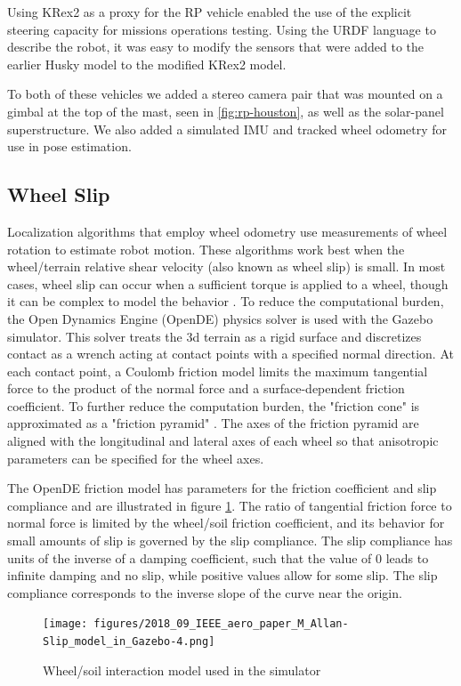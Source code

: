 \documentclass[twocolumn,letterpaper]{IEEEAerospaceCLS}  %
\begin{document}
Using KRex2 as a proxy for the RP vehicle enabled the use of the explicit steering capacity for missions operations testing.  
Using the URDF language to describe the robot, it was easy to modify the sensors that were added to the earlier Husky model to the modified KRex2 model.  


To both of these vehicles we added a stereo camera pair that was mounted on a gimbal at the top of the mast, seen in \cref{fig:rp-houston}, as well as the solar-panel superstructure. 
We also added a simulated IMU and tracked wheel odometry for use in pose estimation.  

\subsection{Wheel Slip}
Localization algorithms that employ wheel odometry use measurements of wheel rotation to estimate robot motion.
These algorithms work best when the wheel/terrain relative shear velocity (also known as wheel slip) is small.
In most cases, wheel slip can occur when a sufficient torque is applied to a wheel,
though it can be complex to model the behavior \cite{yoshida1013712}.
To reduce the computational burden, the Open Dynamics Engine (OpenDE) physics solver is used with the Gazebo simulator.
This solver treats the 3d terrain as a rigid surface and discretizes contact as a wrench
acting at contact points with a specified normal direction.
At each contact point, a Coulomb friction model limits the maximum tangential force
to the product of the normal force and a surface-dependent friction coefficient.
To further reduce the computation burden, the "friction cone" is approximated
as a "friction pyramid" \cite{hsuPeters2014}.
The axes of the friction pyramid are aligned with the longitudinal and lateral axes of each wheel
so that anisotropic parameters can be specified for the wheel axes.

The OpenDE friction model has parameters for the friction coefficient and slip compliance
and are illustrated in figure \ref{fig:wheelsoilmodel}.
The ratio of tangential friction force to normal force is limited by the wheel/soil friction coefficient,
and its behavior for small amounts of slip is governed by the slip compliance.
The slip compliance has units of the inverse of a damping coefficient,
such that the value of 0 leads to infinite damping and no slip,
while positive values allow for some slip.
The slip compliance corresponds to the inverse slope of the curve near the origin.

\begin{figure}[h!]
    \texttt{[image: figures/2018\_09\_IEEE\_aero\_paper\_M\_Allan-Slip\_model\_in\_Gazebo-4.png]}
    \caption{Wheel/soil interaction model used in the simulator}
    \label{fig:wheelsoilmodel}
\end{figure}
\end{document}

